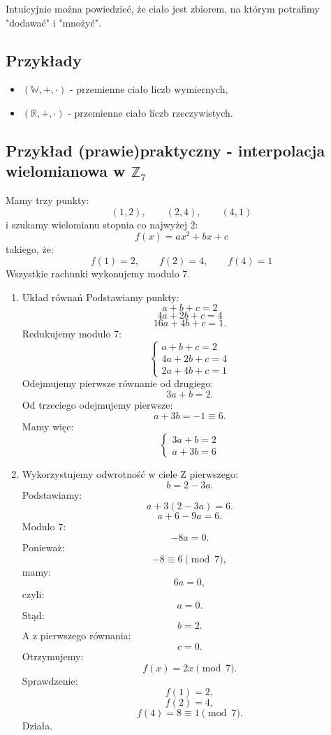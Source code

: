 \documentclass{article}
\begin{document}
Intuicyjnie można powiedzieć, że ciało jest zbiorem, na którym potrafimy "dodawać" i "mnożyć".

\subsection{Przykłady}
\begin{itemize}
    \item $(\mathbb{W}, +, \cdot)$ - przemienne ciało liczb wymiernych,
    \item $(\mathbb{R}, +, \cdot)$ - przemienne ciało liczb rzeczywistych.
\end{itemize}

\subsection{Przykład (prawie)praktyczny - interpolacja wielomianowa w \(\mathbb Z_7\)}
Mamy trzy punkty:
$$ (1,2),\qquad(2,4),\qquad(4,1) $$
i szukamy wielomianu stopnia co najwyżej 2:
$$ f(x)=ax^2+bx+c $$
takiego, że:
$$ f(1)=2,\qquad f(2)=4,\qquad f(4)=1 $$
Wszystkie rachunki wykonujemy modulo 7.

\begin{enumerate}
    \item Układ równań
    Podstawiamy punkty:
    $$ a+b+c=2 $$ $$ 4a+2b+c=4 $$ $$ 16a+4b+c=1. $$
    Redukujemy modulo 7:
    $$ \begin{cases} a+b+c=2\\ 4a+2b+c=4\\ 2a+4b+c=1 \end{cases} $$
    Odejmujemy pierwsze równanie od drugiego:
    $$ 3a+b=2. $$
    Od trzeciego odejmujemy pierwsze:
    $$ a+3b=-1\equiv6. $$
    Mamy więc:
    $$ \begin{cases} 3a+b=2\\ a+3b=6 \end{cases} $$

    \item Wykorzystujemy odwrotność w ciele
    Z pierwszego:
    $$ b=2-3a. $$
    Podstawiamy:
    $$ a+3(2-3a)=6. $$ $$ a+6-9a=6. $$
    Modulo 7:
    $$ -8a=0. $$
    Ponieważ:
    $$ -8\equiv6\pmod7, $$
    mamy:
    $$ 6a=0, $$
    czyli:
    $$ a=0. $$
    Stąd:
    $$ b=2. $$
    A z pierwszego równania:
    $$ c=0. $$
    Otrzymujemy:
    $$ \boxed{f(x)=2x\pmod7}. $$
    Sprawdzenie:
    $$ f(1)=2, $$ $$ f(2)=4, $$ $$ f(4)=8\equiv1\pmod7. $$
    Działa.
\end{enumerate}
\end{document}
